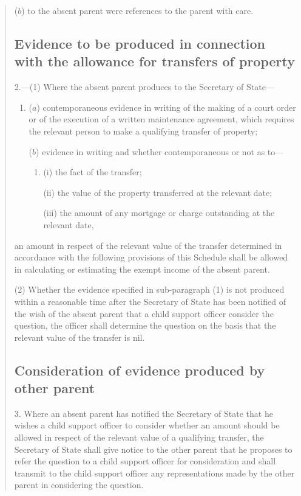 \documentclass[12pt,a4paper]{article}
\begin{document}
\begin{quotation}
\begin{enumerate}
($b$) to the absent parent were references to the parent with care.
\end{enumerate}

\subsection*{\sloppy Evidence to be produced in connection with the allowance for transfers of property}

2.—(1) Where the absent parent produces to the Secretary of State—
\begin{enumerate}\item[]
($a$) contemporaneous evidence in writing of the making of a court order or of the execution of a written maintenance agreement, which requires the relevant person to make a qualifying transfer of property;

($b$) evidence in writing and whether contemporaneous or not as to—
\begin{enumerate}\item[]
(i) the fact of the transfer;

(ii) the value of the property transferred at the relevant date;

(iii) the amount of any mortgage or charge outstanding at the relevant date,
\end{enumerate}
\end{enumerate}
an amount in respect of the relevant value of the transfer determined in accordance with the following provisions of this Schedule shall be allowed in calculating or estimating the exempt income of the absent parent.

(2) Whether the evidence specified in sub-paragraph (1) is not produced within a reasonable time after the Secretary of State has been notified of the wish of the absent parent that a child support officer consider the question, the officer shall determine the question on the basis that the relevant value of the transfer is nil.

\subsection*{Consideration of evidence produced by other parent}

3.  Where an absent parent has notified the Secretary of State that he wishes a child support officer to consider whether an amount should be allowed in respect of the relevant value of a qualifying transfer, the Secretary of State shall give notice to the other parent that he proposes to refer the question to a child support officer for consideration and shall transmit to the child support officer any representations made by the other parent in considering the question.


\end{quotation}
\end{document}
